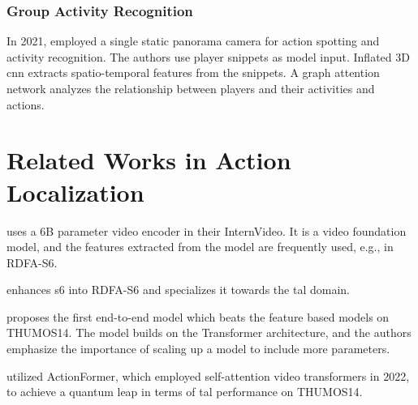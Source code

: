 \subsubsection{Group Activity Recognition}

In 2021, \textcite{gerats_individual_same_task_2021} employed a single static panorama camera for action spotting and activity recognition. The authors use player snippets as model input. Inflated 3D \acrshort{cnn} extracts spatio-temporal features from the snippets. A graph attention network analyzes the relationship between players and their activities and actions.

\section{Related Works in Action Localization}
\label{sec:related_works_all}

\textcite{wang_internvideo2_2024} uses a 6B parameter video encoder in their InternVideo. It is a video foundation model, and the features extracted from the model are frequently used, e.g., in RDFA-S6.

\textcite{lee_enhancing_mamba_s6_2024} enhances \acrshort{s6} into RDFA-S6 and specializes it towards the \acrshort{tal} domain. 

\textcite{liu_adatad_2024} proposes the first end-to-end model which beats the feature based models on THUMOS14. The model builds on the Transformer architecture, and the authors emphasize the importance of scaling up a model to include more parameters. 

\textcite{zhang_actionformer_2022} utilized ActionFormer, which employed self-attention video transformers in 2022, to achieve a quantum leap in terms of \acrfull{tal} performance on THUMOS14. 

